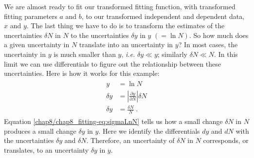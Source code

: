 \documentclass[letterpaper,10pt,english]{sphinxmanual}
\begin{document}
We are almost ready to fit our transformed fitting function, with transformed fitting parameters \(a\) and \(b\), to our transformed independent and dependent data, \(x\) and \(y\).  The last thing we have to do is to transform the estimates of the uncertainties \(\delta N\) in \(N\) to the uncertainties \(\delta y\) in \(y\) \((= \ln N)\).  So how much does a given uncertainty in \(N\) translate into an uncertainty in \(y\)?  In most cases, the uncertainty in \(y\) is much smaller than \(y\), \emph{i.e.} \(\delta y \ll y\); similarly \(\delta N \ll N\).  In this limit we can use differentials to figure out the relationship between these uncertainties.  Here is how it works for this example:
\label{chap8/chap8_fitting:equation-eq:sigmaLnN}\begin{gather}
\begin{split}y &= \ln N\\
\delta y &= \left|\frac{\partial y}{\partial N}\right|\delta N\\
\delta y &= \frac{\delta N} {N} \;.\end{split}\label{chap8/chap8_fitting-eq:sigmaLnN}
\end{gather}
Equation \eqref{chap8/chap8_fitting-eq:sigmaLnN} tells us how a small change \(\delta N\) in \(N\) produces a small change \(\delta y\) in \(y\).  Here we identify the differentials \(dy\) and \(dN\) with the uncertainties \(\delta y\) and \(\delta N\).  Therefore, an uncertainty of \(\delta N\) in \(N\) corresponds, or translates, to an uncertainty \(\delta y\) in \(y\).
\end{document}
